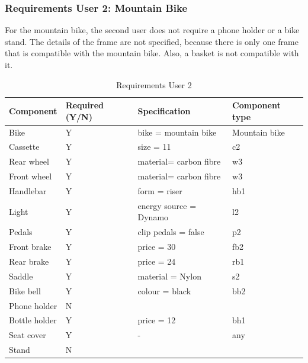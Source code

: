 \subsubsection{Requirements User 2: Mountain Bike}
For the mountain bike, the second user does not require a phone holder or a bike stand. The details of the frame are not specified, because there is only one frame that is compatible with the mountain bike.
Also, a basket is not compatible with it. 

\begin{table}[H]
\centering
\begin{tabular}{llll}
\hline
Component       & Required   (Y/N)  & Specification             & Component type   \\ \hline
Bike            & Y                 & bike = mountain bike      & Mountain bike \\
Cassette        & Y                 & size = 11                 & c2              \\
Rear wheel      & Y                 & material= carbon fibre    & w3              \\
Front wheel     & Y                 & material= carbon fibre    & w3              \\
Handlebar       & Y                 & form = riser              & hb1             \\
Light           & Y                 & energy source = Dynamo    & l2              \\
Pedals          & Y                 & clip pedals = false       & p2              \\
Front brake     & Y                 & price = 30                & fb2             \\
Rear brake      & Y                 & price = 24                & rb1             \\
Saddle          & Y                 & material = Nylon          & s2              \\
Bike bell       & Y                 & colour = black            & bb2             \\
Phone holder    & N                 &                           &               \\
Bottle   holder & Y                 & price = 12                & bh1             \\
Seat cover      & Y                 & -                         & any             \\ 
Stand           & N                 &                           &          \\      \hline
\end{tabular}
\caption{Requirements User 2}
\label{tab:userreq2}
\end{table}

